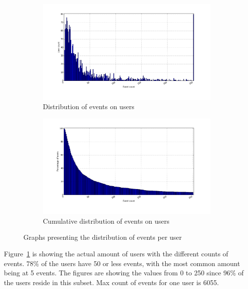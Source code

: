     \begin{figure}[H]
        \centering
        \begin{subfigure}{.5\textwidth}
            \centering
            \includegraphics[width=\dualGraphWidth]{image/user_iddistribution.png}
            \caption{Distribution of events on users}
    \label{figure:userEventDist}
        \end{subfigure}%
        \begin{subfigure}{.5\textwidth}
            \centering
            \includegraphics[width=\dualGraphWidth]{image/user_idcumdistribution.png}
            \caption{Cumulative distribution of events on users}
    \label{figure:userEventCumDist}
        \end{subfigure}
        \caption{Graphs presenting the distribution of events per user}
    \end{figure}
        Figure~\ref{figure:userEventDist} is showing the actual amount of users with the different counts of events.
        78\% of the users have 50 or less events, with the most common amount being at 5 events.
        The figures are showing the values from 0 to 250 since 96\% of the users reside in this subset.
        Max count of events for one user is 6055.

